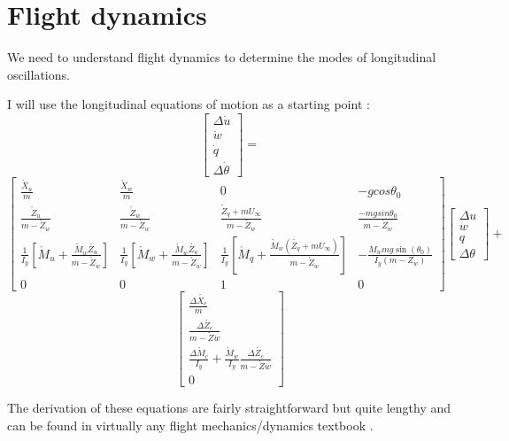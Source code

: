 \documentclass[
11pt, %
english, %
onehalfspacex, %
headsepline, %
] %
{MastersDoctoralThesis}
\begin{document}
\section{Flight dynamics}

We need to understand flight dynamics to determine the modes of longitudinal oscillations.

I will use the longitudinal equations of motion as a starting point :
$$\begin{bmatrix}\Delta\dot{u}\\\dot{w}\\\dot{q}\\\Delta\dot{\theta}\end{bmatrix} =$$
$$ \begin{bmatrix}\frac{\mathring{X}_{u}}{m}&\frac{\mathring{X}_{w}}{m}&0&-gcos\theta_{0}\\\frac{\mathring{Z}_{u}}{m-\mathring{Z}_{\dot{w}}}&\frac{\mathring{Z}_{w}}{m-\mathring{Z}_{\dot{w}}}&\frac{\mathring{Z}_{q}+mU_{\infty}}{m-\mathring{Z}_{\dot{w}}}&\frac{-mgsin\theta_{0}}{m-\mathring{Z}_{\dot{w}}}\\\frac{1}{I_{y}}\left[\mathring{M}_{u}+\frac{\mathring{M}_{\dot{w}}\mathring{Z_{u}}}{m-\mathring{Z}_{\dot{w}}}\right]&\frac{1}{I_{y}}\left[\mathring{M}_{w}+\frac{\mathring{M}_{\dot{w}}\mathring{Z_{u}}}{m-\mathring{Z}_{\dot{w}}}\right]&\frac{1}{I_{y}}\left[\mathring{M}_{q}+\frac{\mathring{M}_{\dot{w}}(\mathring{Z_{q}}+mU_{\infty})}{m-\mathring{Z}_{\dot{w}}}\right]&-\frac{M_{\dot{w}}mg\sin(\theta_{0})}{I_{y}(m-Z_{\dot{w}})}\\0&0&1&0\end{bmatrix}\begin{bmatrix}\Delta u\\w\\q\\\Delta\theta\end{bmatrix}+$$
$$\begin{bmatrix}\frac{\Delta \mathring{X_{c}}}{m}\\\frac{\Delta \mathring{Z_{c}}}{m-\mathring{Z}{\dot{w}}}\\\frac{\Delta \mathring{M}_{c}}{I_{y}} + \frac{\mathring{M}_{\dot{w}}}{I_{y}}\frac{\Delta \mathring{Z_{c}}}{m-\mathring{Z}{\dot{w}}}\\0\end{bmatrix}$$ 

The derivation of these equations are fairly straightforward but quite lengthy and can be found in virtually any flight mechanics/dynamics textbook \cite{etkin}.
\end{document}
